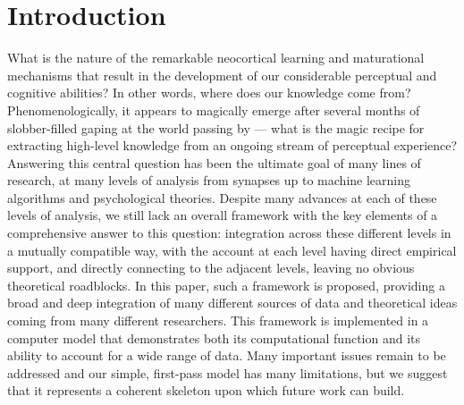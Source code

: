 \documentclass[11pt,twoside]{article}
\newif\myifpdf
\begin{document}
\titlesepage{\mytitle}{\myauthor}{\mynote}{\myabstract}





\pagestyle{myheadings}



\section{Introduction}

What is the nature of the remarkable neocortical learning and maturational mechanisms that result in the development of our considerable perceptual and cognitive abilities?  In other words, where does our knowledge come from?  Phenomenologically, it appears to magically emerge after several months of slobber-filled gaping at the world passing by --- what is the magic recipe for extracting high-level knowledge from an ongoing stream of perceptual experience?  Answering this central question has been the ultimate goal of many lines of research, at many levels of analysis from synapses up to machine learning algorithms and psychological theories.  Despite many advances at each of these levels of analysis, we still lack an overall framework with the key elements of a comprehensive answer to this question: integration across these different levels in a mutually compatible way, with the account at each level having direct empirical support, and directly connecting to the adjacent levels, leaving no obvious theoretical roadblocks.  In this paper, such a framework is proposed, providing a broad and deep integration of many different sources of data and theoretical ideas coming from many different researchers.  This framework is implemented in a computer model that demonstrates both its computational function and its ability to account for a wide range of data.  Many important issues remain to be addressed and our simple, first-pass model has many limitations, but we suggest that it represents a coherent skeleton upon which future work can build.
\end{document}
